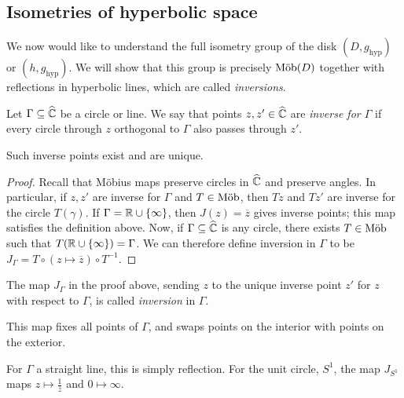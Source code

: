 \subsection{Isometries of hyperbolic space}
We now would like to understand the full isometry group of the disk \( (D, g_{\text{hyp}}) \) or \( (h, g_{\text{hyp}}) \).
We will show that this group is precisely \( \text{M\"ob}(D) \) together with reflections in hyperbolic lines, which are called \textit{inversions}.
\begin{definition}
	Let \( \Gamma \subseteq \widehat{\mathbb C} \) be a circle or line.
	We say that points \( z, z' \in \widehat{\mathbb C} \) are \textit{inverse for \( \Gamma \)} if every circle through \( z \) orthogonal to \( \Gamma \) also passes through \( z' \).
\end{definition}
\begin{lemma}
	Such inverse points exist and are unique.
\end{lemma}
\begin{proof}
	Recall that M\"obius maps preserve circles in \( \widehat{\mathbb C} \) and preserve angles.
	In particular, if \( z, z' \) are inverse for \( \Gamma \) and \( T \in \text{M\"ob} \), then \( Tz \) and \( Tz' \) are inverse for the circle \( T(\gamma) \).
	If \( \Gamma = \mathbb R \cup \qty{\infty} \), then \( J(z) = \overline z \) gives inverse points; this map satisfies the definition above.
	Now, if \( \Gamma \subseteq \widehat{\mathbb C} \) is any circle, there exists \( T \in \text{M\"ob} \) such that \( T \qty(\mathbb R \cup \qty{\infty}) = \Gamma \).
	We can therefore define inversion in \( \Gamma \) to be \( J_\Gamma = T \circ (z \mapsto \overline z) \circ T^{-1} \).
\end{proof}
\begin{definition}
	The map \( J_\Gamma \) in the proof above, sending \( z \) to the unique inverse point \( z' \) for \( z \) with respect to \( \Gamma \), is called \textit{inversion} in \( \Gamma \).
\end{definition}
This map fixes all points of \( \Gamma \), and swaps points on the interior with points on the exterior.
\begin{example}
	For \( \Gamma \) a straight line, this is simply reflection.
	For the unit circle, \( S^1 \), the map \( J_{S^1} \) maps \( z \mapsto \frac{1}{\overline z} \) and \( 0 \mapsto \infty \).
\end{example}
